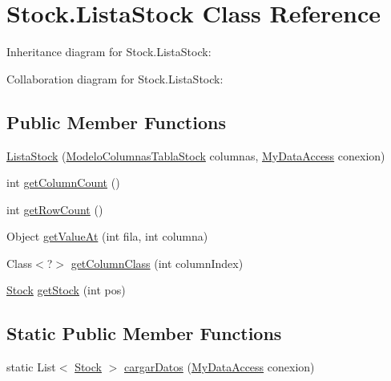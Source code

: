 \hypertarget{class_stock_1_1_lista_stock}{}\section{Stock.\+Lista\+Stock Class Reference}
\label{class_stock_1_1_lista_stock}


Inheritance diagram for Stock.\+Lista\+Stock\+:


Collaboration diagram for Stock.\+Lista\+Stock\+:
\subsection*{Public Member Functions}
\begin{DoxyCompactItemize}
\item 
\mbox{\hyperlink{class_stock_1_1_lista_stock_a21df0fe48a39fb1aac80a2ca7fb67c0a}{Lista\+Stock}} (\mbox{\hyperlink{class_stock_1_1_modelo_columnas_tabla_stock}{Modelo\+Columnas\+Tabla\+Stock}} columnas, \mbox{\hyperlink{classconexion_s_q_l_1_1_my_data_access}{My\+Data\+Access}} conexion)
\item 
int \mbox{\hyperlink{class_stock_1_1_lista_stock_ad1b8da2d5ddcb4627e47533953e12d84}{get\+Column\+Count}} ()
\item 
int \mbox{\hyperlink{class_stock_1_1_lista_stock_a52c69465417c81534f1433dc56f749d9}{get\+Row\+Count}} ()
\item 
Object \mbox{\hyperlink{class_stock_1_1_lista_stock_ac181755caf0025ec10ae230927bb457f}{get\+Value\+At}} (int fila, int columna)
\item 
Class$<$?$>$ \mbox{\hyperlink{class_stock_1_1_lista_stock_a18471e9271be7455310d9a277337c38e}{get\+Column\+Class}} (int column\+Index)
\item 
\mbox{\hyperlink{class_stock_1_1_stock}{Stock}} \mbox{\hyperlink{class_stock_1_1_lista_stock_a17681900b9bdf6909a15c61b4946d080}{get\+Stock}} (int pos)
\end{DoxyCompactItemize}
\subsection*{Static Public Member Functions}
\begin{DoxyCompactItemize}
\item 
static List$<$ \mbox{\hyperlink{class_stock_1_1_stock}{Stock}} $>$ \mbox{\hyperlink{class_stock_1_1_lista_stock_ae43d6e1304e10935ed275f770f6fd743}{cargar\+Datos}} (\mbox{\hyperlink{classconexion_s_q_l_1_1_my_data_access}{My\+Data\+Access}} conexion)
\end{DoxyCompactItemize}


